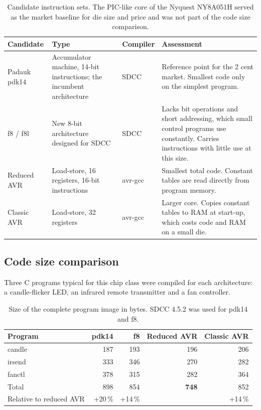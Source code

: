 \documentclass[10pt,a4paper]{article}
\begin{document}
\begin{table}[!htb]
\centering\small
\begin{tabularx}{\linewidth}{@{}l>{\raggedright\arraybackslash}p{38mm}lL@{}}
\toprule
Candidate & Type & Compiler & Assessment \\
\midrule
Padauk pdk14 & Accumulator machine, 14-bit instructions; the incumbent architecture & SDCC &
Reference point for the 2 cent market. Smallest code only on the simplest program. \\
f8 / f8l & New 8-bit architecture designed for SDCC & SDCC &
Lacks bit operations and short addressing, which small control programs use constantly. Carries instructions
with little use at this size. \\
Reduced AVR & Load-store, 16 registers, 16-bit instructions & avr-gcc &
Smallest total code. Constant tables are read directly from program memory. \\
Classic AVR & Load-store, 32 registers & avr-gcc &
Larger core. Copies constant tables to RAM at start-up, which costs code and RAM on a small die. \\
\bottomrule
\end{tabularx}
\caption{Candidate instruction sets. The PIC-like core of the Nyquest NY8A051H served as the market baseline for
die size and price and was not part of the code size comparison.}
\end{table}

\subsection{Code size comparison}

Three C programs typical for this chip class were compiled for each architecture: a candle-flicker LED, an
infrared remote transmitter and a fan controller.

\begin{table}[!htb]
\centering\small
\begin{tabular}{@{}lrrrr@{}}
\toprule
Program & pdk14 & f8 & Reduced AVR & Classic AVR \\
\midrule
candle & 187 & 193 & 196 & 206 \\
irsend & 333 & 346 & 270 & 282 \\
fanctl & 378 & 315 & 282 & 364 \\
\midrule
Total & 898 & 854 & \textbf{748} & 852 \\
Relative to reduced AVR & +20\,\% & +14\,\% & & +14\,\% \\
\bottomrule
\end{tabular}
\caption{Size of the complete program image in bytes. SDCC 4.5.2 was used for pdk14 and f8.}
\end{table}
\end{document}
